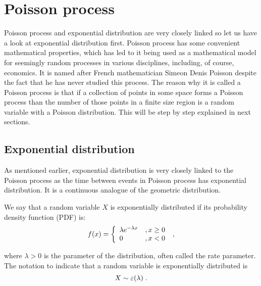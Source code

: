 \documentclass[times, utf8, diplomski]{fer}
\begin{document}
	\section{Poisson process}
	Poisson process and exponential distribution are very closely linked so let us have a look at exponential distribution first. Poisson process has some convenient mathematical properties, which has led to it being used as a mathematical model for seemingly random processes in various disciplines, including, of course, economics. It is named after French mathematician Simeon Denis Poisson despite the fact that he has never studied this process. The reason why it is called a Poisson process is that if a collection of points in some space forms a Poisson process than the number of those points in a finite size region is a random variable with a Poisson distribution. This will be step by step explained in next sections.
		\subsection{Exponential distribution}
		As mentioned earlier, exponential distribution is very closely linked to the Poisson process as the time between events in Poisson process has exponential distribution. It is a continuous analogue of the geometric distribution.
			\begin{definition}
			\label{exponential}
			We say that a random variable $X$ is exponentially distributed if its probability density function (PDF) is:
			\begin{equation}
				f(x) = \left\{ \begin{array}{lc} \lambda e^{-\lambda x} &, x \geq 0 \\
												0 &, x < 0 \end{array}\right. \hspace{0.1cm},
			\end{equation}

			\noindent where $\lambda > 0$ is the parameter of the distribution, often called the rate parameter. The notation to indicate that a random variable is exponentially distributed is $$X \sim \varepsilon(\lambda) \hspace{0.1cm}.$$
			\end{definition}
\end{document}
